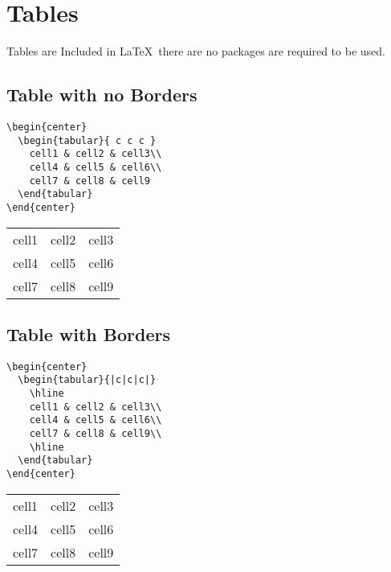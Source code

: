 \documentclass[10pt, letterpaper]{article}
\begin{document}
\section{Tables}
Tables are Included in \LaTeX ~there are no packages are required to be used.
\subsection{Table with no Borders}
\begin{multicols}{2}
\lstset{style=basicstyle}
\begin{lstlisting}[]
\begin{center}
  \begin{tabular}{ c c c }
    cell1 & cell2 & cell3\\
    cell4 & cell5 & cell6\\
    cell7 & cell8 & cell9
  \end{tabular}
\end{center}
\end{lstlisting}
\columnbreak
\begin{center}
  \begin{tabular}{ c c c }
    cell1 & cell2 & cell3\\
    cell4 & cell5 & cell6\\
    cell7 & cell8 & cell9
  \end{tabular}
\end{center}
\end{multicols}

\subsection{Table with Borders}
\begin{multicols}{2}
\lstset{style=basicstyle}
\begin{lstlisting}[]
\begin{center}
  \begin{tabular}{|c|c|c|}
    \hline
    cell1 & cell2 & cell3\\
    cell4 & cell5 & cell6\\
    cell7 & cell8 & cell9\\
    \hline
  \end{tabular}
\end{center}
\end{lstlisting}
\columnbreak
\begin{center}
  \begin{tabular}{|c|c|c|}
    \hline
    cell1 & cell2 & cell3\\
    cell4 & cell5 & cell6\\
    cell7 & cell8 & cell9\\
    \hline
  \end{tabular}
\end{center}
\end{multicols}
\end{document}

